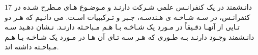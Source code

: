 \exercise
$17$
دانـشمند در یک کنفرانـس علمی شـرکت دارنـد و مـوضـوع هـای مـطرح شـده در کنفرانـس، در سـه شـاخـه ی هـندسـه، جـبر و تـرکیبیات اسـت. می دانـیم که هـر دو تـایی از آنهـا دقـیقاً در مـورد یک شـاخـه بـا هـم مـباحـثه دارنـد. نـشان دهـید سـه دانـشمند وجـود دارنـد بـه طـوری که هـر سـه تـای آن هـا در مـورد یک شـاخـه بـا هـم مـباحـثه
داشته اند.